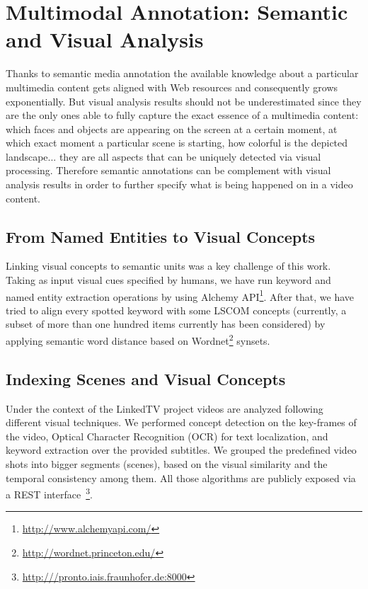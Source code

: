 \documentclass[a4paper,11pt]{report}
\begin{document}
\section*{Multimodal Annotation: Semantic and Visual Analysis} \label{semanticVisual}

Thanks to semantic media annotation the available knowledge about a particular multimedia content gets aligned with Web resources and consequently grows exponentially. But visual analysis results should not be underestimated since they are the only ones able to fully capture the exact essence of a multimedia content: which faces and objects are appearing on the screen at a certain moment, at which exact moment a particular scene is starting, how colorful is the depicted landscape... they are all aspects that can be uniquely detected via visual processing. Therefore semantic annotations can be complement with visual analysis results in order to further specify what is being happened on in a video content. 

\subsection*{From Named Entities to Visual Concepts}

Linking visual concepts to semantic units was a key challenge of this work. Taking as input visual cues specified by humans, we have run keyword and named entity extraction operations by using Alchemy API\footnote{\url{http://www.alchemyapi.com/}}. After that, we have tried to align every spotted keyword with some LSCOM concepts (currently, a subset of more than one hundred items currently has been considered) by applying  semantic word distance based on Wordnet\footnote{\url{http://wordnet.princeton.edu/}} synsets.

\subsection*{Indexing Scenes and Visual Concepts}

Under the context of the LinkedTV project videos are analyzed following different visual techniques. We performed concept detection on the key-frames of the video, Optical Character Recognition (OCR) for text localization, and keyword extraction over the provided subtitles. We grouped the predefined video shots into bigger segments (scenes), based on the visual similarity and the temporal consistency among them. All those algorithms are publicly exposed via a REST interface~\footnote{\url{ http:///pronto.iais.fraunhofer.de:8000}}. 
\end{document}
